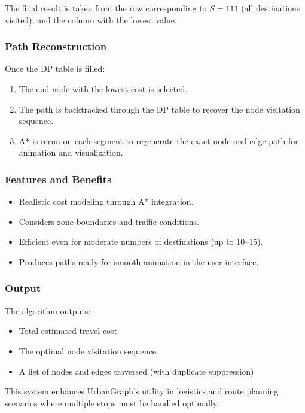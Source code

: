 \documentclass[12pt]{article}
\begin{document}
The final result is taken from the row corresponding to \( S = 111 \) (all destinations visited), and the column with the lowest value.


\subsubsection*{Path Reconstruction}

Once the DP table is filled:
\begin{enumerate}
    \item The end node with the lowest cost is selected.
    \item The path is backtracked through the DP table to recover the node visitation sequence.
    \item A* is rerun on each segment to regenerate the exact node and edge path for animation and visualization.
\end{enumerate}

\subsubsection*{Features and Benefits}


\begin{itemize}
    \item Realistic cost modeling through A* integration.
    \item Considers zone boundaries and traffic conditions.
    \item Efficient even for moderate numbers of destinations (up to 10–15).
    \item Produces paths ready for smooth animation in the user interface.
\end{itemize}

\subsubsection*{Output}

The algorithm outputs:
\begin{itemize}
    \item Total estimated travel cost
    \item The optimal node visitation sequence
    \item A list of nodes and edges traversed (with duplicate suppression)
\end{itemize}

This system enhances UrbanGraph’s utility in logistics and route planning scenarios where multiple stops must be handled optimally.
\end{document}
